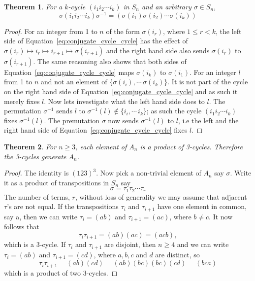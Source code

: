 \documentclass[a4paper,10pt]{article}
\newtheorem{theorem}{Theorem}
\begin{document}
\begin{theorem} 
For a $k$-cycle $(i_1 i_2 \cdots i_k)$ in $S_n$ and an arbitrary $\sigma \in S_n$,
\begin{equation}
\label{eq:conjugate_cycle_cycle}
\sigma(i_1 i_2 \cdots i_k)\sigma^{-1} = (\sigma(i_1) \sigma(i_2)\cdots \sigma(i_k)) 
\end{equation}
\end{theorem}
\begin{proof}
For an integer from 1 to $n$ of the form $\sigma(i_r)$, where $1 \leq r < k$, the left side of Equation~\ref{eq:conjugate_cycle_cycle} has the effect of $\sigma(i_r) \mapsto i_r \mapsto i_{r+1} \mapsto \sigma(i_{r+1})$ and the right hand side also sends $\sigma(i_r)$ to $\sigma(i_{r+1})$. The same reasoning also shows that both sides of Equation~\ref{eq:conjugate_cycle_cycle} maps $\sigma(i_k)$ to $\sigma(i_{1})$. For an integer $l$ from 1 to $n$ and not an element of $\{\sigma(i_i),\cdots\,\sigma(i_k)\}$. It is not part of the cycle on the right hand side of Equation~\ref{eq:conjugate_cycle_cycle} and as such it merely fixes $l$. Now lets investigate what the left hand side does to $l$. The permutation $\sigma^{-1}$ sends $l$ to $\sigma^{-1}(l) \notin \{i_i,\cdots\,i_k\}$; as such the cycle $(i_1 i_2 \cdots i_k)$ fixes $\sigma^{-1}(l)$. The premutation $\sigma$ now sends $\sigma^{-1}(l)$ to $l$, i.e the left and the right hand side of Equation~\ref{eq:conjugate_cycle_cycle} fixes $l$.         
\end{proof}


\begin{theorem}
For $n\geq 3$, each element of $A_n$ is a product of 3-cycles. Therefore the 3-cycles generate $A_n$.
\end{theorem}
\begin{proof}
The identity is $(123)^3$. Now pick a non-trivial element of $A_n$ say $\sigma$. Write it as a product of transpositions in $S_n$ say
\begin{equation}
\sigma = \tau_1\tau_2 \cdots \tau_r 
\end{equation}
The number of terms, $r$, without loss of generality we may assume that adjacent $\tau$'s are not equal. If the transpositions $\tau_i$ and $\tau_{i+1}$ have one element in common, say a, then we can write $\tau_i = (ab)$ and $\tau_{i+1}=(ac)$, where $b\neq c$. It now follows that
\begin{equation}
\tau_i\tau_{i+1} = (ab)(ac) = (acb), 
\end{equation}
which is a 3-cycle. If $\tau_i$ and $\tau_{i+1}$ are disjoint, then $n\geq 4$ and we can write $\tau_i = (ab)$ and $\tau_{i+1} = (cd)$, where $a,b,c$ and $d$ are distinct, so 
\begin{equation}
\tau_i\tau_{i+1}=(ab)(cd)=(ab)(bc)(bc)(cd)=(bca)%
\end{equation}
which is a product of two 3-cycles.



\end{proof}
\end{document}
